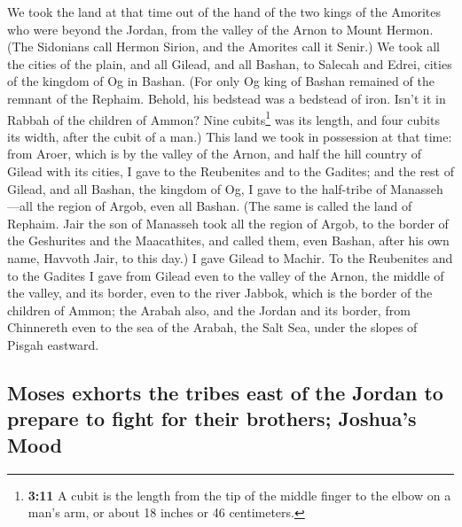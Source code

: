 \begin{paracol}{2}
\begin{otherlanguage}{english}
 We took the land at that time out of the hand of the two
kings of the Amorites who were beyond the Jordan, from the valley of the
Arnon to Mount Hermon.  (The Sidonians call Hermon Sirion,
and the Amorites call it Senir.)  We took all the cities
of the plain, and all Gilead, and all Bashan, to Salecah and Edrei,
cities of the kingdom of Og in Bashan.  (For only Og king
of Bashan remained of the remnant of the Rephaim. Behold, his bedstead
was a bedstead of iron. Isn't it in Rabbah of the children of Ammon?
Nine cubits\footnote{\textbf{3:11} A cubit is the length from the tip of
  the middle finger to the elbow on a man's arm, or about 18 inches or
  46 centimeters.} was its length, and four cubits its width, after the
cubit of a man.)  This land we took in possession at that
time: from Aroer, which is by the valley of the Arnon, and half the hill
country of Gilead with its cities, I gave to the Reubenites and to the
Gadites;  and the rest of Gilead, and all Bashan, the
kingdom of Og, I gave to the half-tribe of Manasseh---all the region of
Argob, even all Bashan. (The same is called the land of Rephaim.
 Jair the son of Manasseh took all the region of Argob,
to the border of the Geshurites and the Maacathites, and called them,
even Bashan, after his own name, Havvoth Jair, to this day.)
 I gave Gilead to Machir.  To the
Reubenites and to the Gadites I gave from Gilead even to the valley of
the Arnon, the middle of the valley, and its border, even to the river
Jabbok, which is the border of the children of Ammon; 
the Arabah also, and the Jordan and its border, from Chinnereth even to
the sea of the Arabah, the Salt Sea, under the slopes of Pisgah
eastward.

\hypertarget{moses-exhorts-the-tribes-east-of-the-jordan-to-prepare-to-fight-for-their-brothers-joshuas-mood}{%
\subsection{Moses exhorts the tribes east of the Jordan to prepare to
fight for their brothers; Joshua's
Mood}\label{moses-exhorts-the-tribes-east-of-the-jordan-to-prepare-to-fight-for-their-brothers-joshuas-mood}}


\end{otherlanguage}
\end{paracol}
